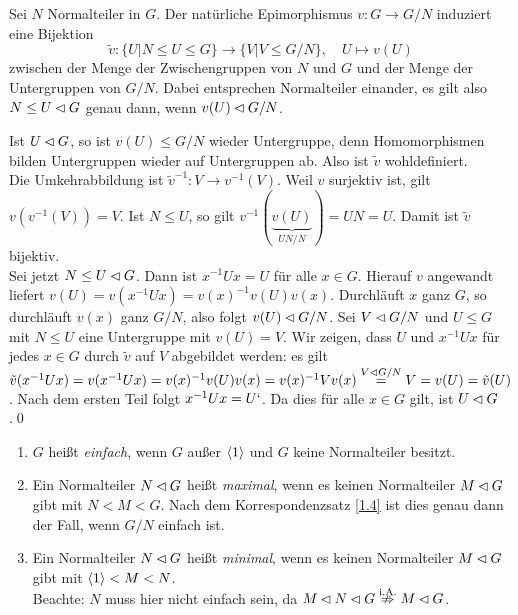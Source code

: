 \begin{satz}[Korrespondenzsatz]\label{korres}\label{1.4}
 Sei $N$ Normalteiler in $G$. Der nat\"urliche Epimorphismus $v: G\to G/N$ induziert eine Bijektion $$\tilde v : \lbrace U|N \leq U \leq G\rbrace \to\lbrace V|V\leq G/N\rbrace, \quad U \longmapsto v(U)$$ zwischen der Menge der Zwischengruppen von $N$ und $G$ und der Menge der Untergruppen von $G/N$. Dabei entsprechen Normalteiler einander, es gilt also $N\leq U \lhd G$ genau dann, wenn $v(U) \lhd G/N$.
\end{satz}
\begin{beweis}
 Ist $U\lhd G$, so ist $v(U) \leq G/N$ wieder Untergruppe, denn Homomorphismen bilden Untergruppen wieder auf Untergruppen ab. Also ist $\tilde v$ wohldefiniert.\\
 Die Umkehrabbildung ist $\tilde v^{-1}:V\to v^{-1}(V)$. Weil $v$ surjektiv ist, gilt $v(v^{-1}(V))=V$. Ist $N\leq U$, so gilt $v^{-1}(\underbrace{v(U)}_{UN/N})=UN=U$.
 Damit ist $\tilde v$ bijektiv.\\
 Sei jetzt $N\leq U \lhd G$. Dann ist $x^{-1}Ux = U$ f\"ur alle $x \in G$. Hierauf $v$ angewandt liefert $v(U) = v(x^{-1}Ux)=v(x)^{-1}v(U)v(x)$. Durchl\"auft $x$ ganz $G$, so durchl\"auft $v(x)$ ganz $G/N$, also folgt $v(U) \lhd G/N$. Sei $V \lhd G/N$ und $U\leq G$ mit $N\leq U$ eine Untergruppe mit $v(U)=V$. Wir zeigen, dass $U$ und $x^{-1}Ux$ f\"ur jedes $x\in G$ durch $\tilde v$ auf $V$ abgebildet werden: es gilt $\tilde v(x^{-1}Ux)=v(x^{-1}Ux)=v(x)^{-1}v(U)v(x)=v(x)^{-1}Vv(x)\stackrel{V\lhd G/N}{=}V=v(U)=\tilde v(U)$. Nach dem ersten Teil folgt $x^{-1}Ux=U`$. Da dies f\"ur alle $x\in G$ gilt, ist $U \lhd G$.\qed
\end{beweis}

\begin{definition}\spspace
{}
 \begin{enumerate}
  \item $G$ hei\ss{}t \emph{einfach}, wenn $G$ au\ss{}er $\left<1\right>$ und $G$ keine Normalteiler besitzt.
  \item Ein Normalteiler $N\lhd G$ hei\ss{}t \emph{maximal}, wenn es keinen Normalteiler $M\lhd G$ gibt mit $N < M < G$. Nach dem Korrespondenzsatz \ref{1.4} ist dies genau dann der Fall, wenn $G/N$ einfach ist.
  \item Ein Normalteiler $N\lhd G$ hei\ss{}t \emph{minimal}, wenn es keinen Normalteiler $M\lhd G$ gibt mit $\left<1\right> < M < N$.\\Beachte: $N$ muss hier nicht einfach sein, da $M\lhd N\lhd G \stackrel{\text{i.A.}}{\nRightarrow} M \lhd G$.
 \end{enumerate}

\end{definition}

